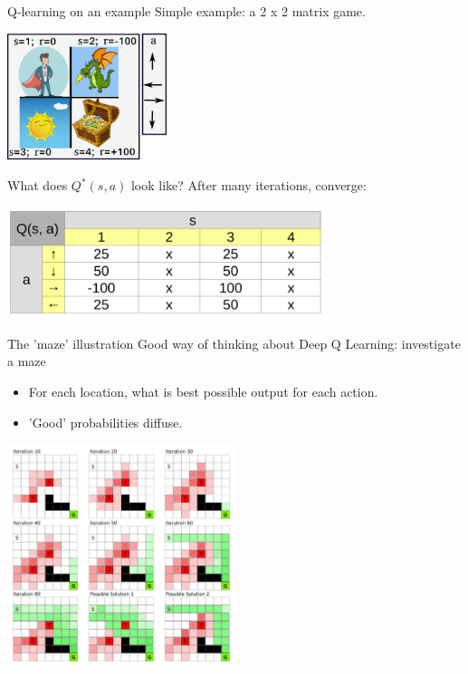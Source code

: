 \documentclass{beamer}
\begin{document}
\begin{frame}{Q-learning on an example}
    Simple example: a 2 x 2 matrix game.

    \begin{center}
      \includegraphics[width=0.35\textwidth]{./Figures/ANNs_reinforcement_learning/Q_learning_example}
    \end{center}

    What does $Q^{*}(s, a)$ look like? After many iterations, converge:

    \begin{center}
      \includegraphics[width=0.7\textwidth]{./Figures/ANNs_reinforcement_learning/Q_learning_example_4}
    \end{center}
\end{frame}



\begin{frame}{The 'maze' illustration}
    Good way of thinking about Deep Q Learning: investigate a maze
    
    \begin{itemize}
        \item For each location, what is best possible output for each action.
        \item 'Good' probabilities diffuse.
    \end{itemize}
    
    \begin{center}
      \includegraphics[width=0.5\textwidth]{./Figures/image_DQL}
    \end{center}
\end{frame}
\end{document}

